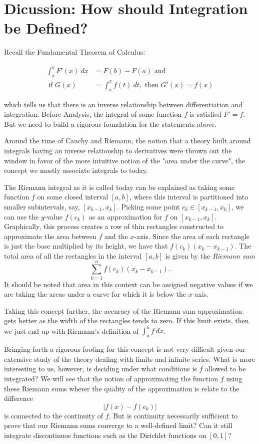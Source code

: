 \section{Dicussion: How should Integration be Defined?}


Recall the Fundamental Theorem of Calculus:

\begin{align*}
	\int_{ a }^{ b } F'(x) \ dx  &= F(b) - F(a) \text{ and } \\
	\text{ if } G(x) &= \int_{ a }^{ x } f(t) \ dt, \text{ then } G'(x) = f(x)
\end{align*}
 
which tells us that there is an inverse relationship between differentiation and integration. Before Analysis, the integral of some function \( f  \) is satisfied \( F' = f  \). But we need to build a rigorous foundation for the statements above. 

Around the time of Cauchy and Riemann, the notion that a theory built around integrals having an inverse relationship to derivatives were thrown out the window in favor of the more intuitive notion of the "area under the curve", the concept we mostly associate integrals to today.

The Riemann integral as it is called today can be explained as taking some function \( f  \) on some closed interval \( [a,b] \), where this interval is partitioned into smaller subintervals, say, \( [ x_{k-1}, x_{k}] \). Picking some point \( c_{k } \in [x_{k-1} , x_{k }] \), we can use the \( y \)-value \( f(c_{k }) \) as an approximation for \( f  \) on \( [x_{k-1}, x_{k }] \). Graphically, this process creates a row of thin rectangles constructed to approximate the area between \( f  \) and the \( x  \)-axis. Since the area of each rectangle is just the base multiplied by its height, we have that \( f(c_{k })(x_{ k } - x_{k - 1 }) \). The total area of all the rectangles in the interval \( [a,b] \) is given by the \textit{Riemann sum} 
\[  \sum_{ k=1 }^{ n } f(c_{k })( x_{k } - x_{k -1}).\] It should be noted that area in this context can be assigned negative values if we are taking the areas under a curve for which it is below the \( x \)-axis.

Taking this concept further, the accuracy of the Riemann sum approximation gets better as the width of the rectangles tends to zero. If this limit exists, then we just end up with Riemann's definition of \( \int_{ a }^{ b } f \ dx \). 

Bringing forth a rigorous footing for this concept is not very difficult given our extensive study of the theory dealing with limits and infinite series. What is more interesting to us, however, is deciding under what conditions is \( f  \) allowed to be integrated? 
We will see that the notion of approximating the function \( f  \) using these Riemann sums wherer the quality of the approximation is relate to the difference
\[  | f(x) - f(c_{k }) | \] is connected to the continuity of \( f  \). But is continuity necessarily sufficient to prove that our Riemann sums converge to a well-defined limit? Can it still integrate discontinuos functions such as the Dirichlet functions on \( [0,1] \)?  



